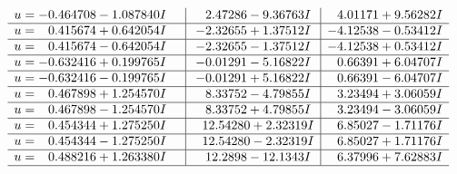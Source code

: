 \documentclass[1p]{elsarticle_modified}
\theoremstyle{definition}
\begin{document}
$$\begin{array}{c|c|c}
\begin{aligned}
u &= -0.464708 - 1.087840 I\end{aligned}
 & \phantom{-}2.47286 - 9.36763 I & \phantom{-}4.01171 + 9.56282 I \\ \hline\begin{aligned}
u &= \phantom{-}0.415674 + 0.642054 I\end{aligned}
 & -2.32655 + 1.37512 I & -4.12538 - 0.53412 I \\ \hline\begin{aligned}
u &= \phantom{-}0.415674 - 0.642054 I\end{aligned}
 & -2.32655 - 1.37512 I & -4.12538 + 0.53412 I \\ \hline\begin{aligned}
u &= -0.632416 + 0.199765 I\end{aligned}
 & -0.01291 - 5.16822 I & \phantom{-}0.66391 + 6.04707 I \\ \hline\begin{aligned}
u &= -0.632416 - 0.199765 I\end{aligned}
 & -0.01291 + 5.16822 I & \phantom{-}0.66391 - 6.04707 I \\ \hline\begin{aligned}
u &= \phantom{-}0.467898 + 1.254570 I\end{aligned}
 & \phantom{-}8.33752 - 4.79855 I & \phantom{-}3.23494 + 3.06059 I \\ \hline\begin{aligned}
u &= \phantom{-}0.467898 - 1.254570 I\end{aligned}
 & \phantom{-}8.33752 + 4.79855 I & \phantom{-}3.23494 - 3.06059 I \\ \hline\begin{aligned}
u &= \phantom{-}0.454344 + 1.275250 I\end{aligned}
 & \phantom{-}12.54280 + 2.32319 I & \phantom{-}6.85027 - 1.71176 I \\ \hline\begin{aligned}
u &= \phantom{-}0.454344 - 1.275250 I\end{aligned}
 & \phantom{-}12.54280 - 2.32319 I & \phantom{-}6.85027 + 1.71176 I \\ \hline\begin{aligned}
u &= \phantom{-}0.488216 + 1.263380 I\end{aligned}
 & \phantom{-}12.2898 - 12.1343 I & \phantom{-}6.37996 + 7.62883 I\\
 \hline 
 \end{array}$$\newpage$$\begin{array}{c|c|c}  

\end{array}$$
\end{document}
